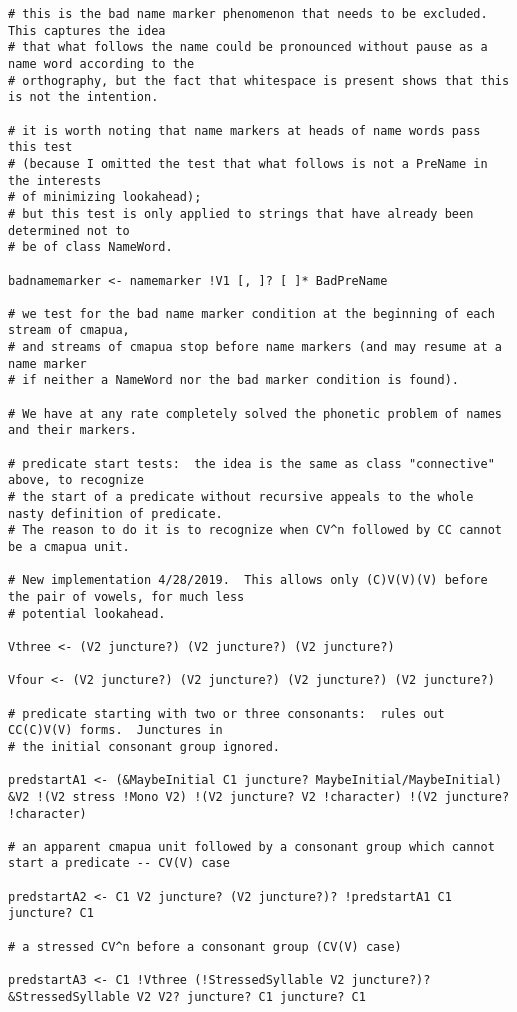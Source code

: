 \documentclass[12pt]{book}
\begin{document}
{\begin{verbatim}
# this is the bad name marker phenomenon that needs to be excluded.  This captures the idea
# that what follows the name could be pronounced without pause as a name word according to the
# orthography, but the fact that whitespace is present shows that this is not the intention.

# it is worth noting that name markers at heads of name words pass this test
# (because I omitted the test that what follows is not a PreName in the interests
# of minimizing lookahead);
# but this test is only applied to strings that have already been determined not to
# be of class NameWord.

badnamemarker <- namemarker !V1 [, ]? [ ]* BadPreName

# we test for the bad name marker condition at the beginning of each stream of cmapua,
# and streams of cmapua stop before name markers (and may resume at a name marker
# if neither a NameWord nor the bad marker condition is found).

# We have at any rate completely solved the phonetic problem of names and their markers.

# predicate start tests:  the idea is the same as class "connective" above, to recognize
# the start of a predicate without recursive appeals to the whole nasty definition of predicate.
# The reason to do it is to recognize when CV^n followed by CC cannot be a cmapua unit.

# New implementation 4/28/2019.  This allows only (C)V(V)(V) before the pair of vowels, for much less
# potential lookahead.

Vthree <- (V2 juncture?) (V2 juncture?) (V2 juncture?)

Vfour <- (V2 juncture?) (V2 juncture?) (V2 juncture?) (V2 juncture?)

# predicate starting with two or three consonants:  rules out CC(C)V(V) forms.  Junctures in
# the initial consonant group ignored.

predstartA1 <- (&MaybeInitial C1 juncture? MaybeInitial/MaybeInitial) &V2 !(V2 stress !Mono V2) !(V2 juncture? V2 !character) !(V2 juncture? !character)

# an apparent cmapua unit followed by a consonant group which cannot start a predicate -- CV(V) case

predstartA2 <- C1 V2 juncture? (V2 juncture?)? !predstartA1 C1 juncture? C1

# a stressed CV^n before a consonant group (CV(V) case)

predstartA3 <- C1 !Vthree (!StressedSyllable V2 juncture?)? &StressedSyllable V2 V2? juncture? C1 juncture? C1


\end{verbatim}}
\end{document}
